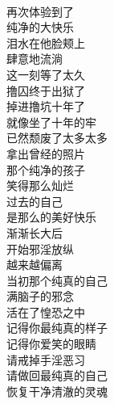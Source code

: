 \begin{poem}[记得你最纯真的样子]
    \begin{multicols}{3}
        \centering~\\
        再次体验到了 \\ 纯净的大快乐 \\ 泪水在他脸颊上 \\ 肆意地流淌 \\ 这一刻等了太久 \\ 撸囚终于出狱了 \\ 掉进撸坑十年了 \\ 就像坐了十年的牢 \\ 已然颓废了太多太多 \\ 拿出曾经的照片 \\ 那个纯净的孩子 \\ 笑得那么灿烂 \\ 过去的自己 \\ 是那么的美好快乐 \\ 渐渐长大后 \\ 开始邪淫放纵 \\ 越来越偏离 \\ 当初那个纯真的自己 \\ 满脑子的邪念 \\ 活在了惶恐之中 \\ 记得你最纯真的样子 \\ 记得你爱笑的眼睛 \\ 请戒掉手淫恶习 \\ 请做回最纯真的自己 \\ 恢复干净清澈的灵魂
    \end{multicols}
\end{poem}

